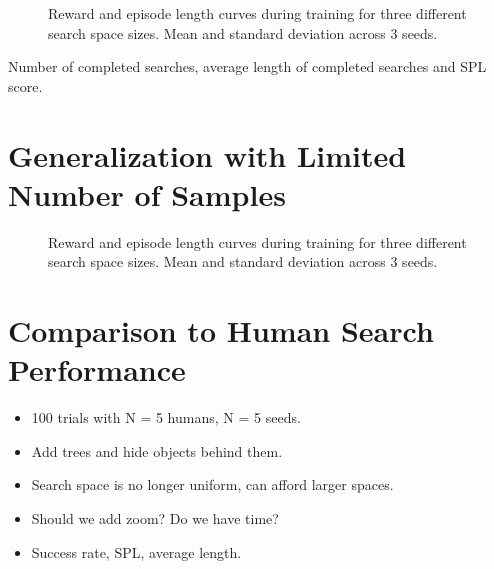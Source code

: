 \begin{figure}
    \centering
    \label{fig:train-shape}
    \caption[Search space size learning curve.]{Reward and episode length curves during training for three different search space sizes. Mean and standard deviation across 3 seeds.}
\end{figure}

\begin{table}
    \caption[Search space performance metrics.]{Number of completed searches, average length of completed searches and SPL score.}
    \centering
    \label{tab:test-shape}
\end{table}

\section{Generalization with Limited Number of Samples}

\begin{figure}
    \centering
    \label{fig:samples}
    \caption[Generalization results.]{Reward and episode length curves during training for three different search space sizes. Mean and standard deviation across 3 seeds.}
\end{figure}


\section{Comparison to Human Search Performance}

\begin{itemize}
    \item 100 trials with N = 5 humans, N = 5 seeds.
    \item Add trees and hide objects behind them.
    \item Search space is no longer uniform, can afford larger spaces.
    \item Should we add zoom? Do we have time?
    \item Success rate, SPL, average length.
\end{itemize}